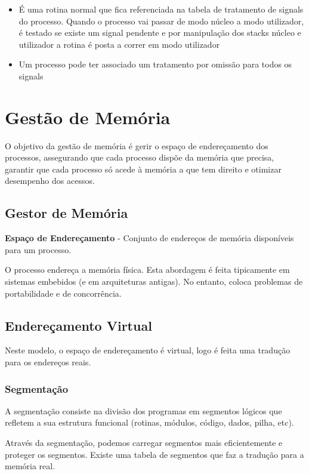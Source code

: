 \documentclass[11pt]{article}
\begin{document}
\begin{itemize}
    \item É uma rotina normal que fica referenciada na tabela de tratamento de signals do processo. Quando o processo vai passar de modo núcleo a modo utilizador, é testado se existe um signal pendente e por manipulação dos stacks núcleo e utilizador a rotina é posta a correr em modo utilizador
    \item Um processo pode ter associado um tratamento por omissão para todos os signals
\end{itemize}

\newpage

\section{Gestão de Memória}

O objetivo da gestão de memória é gerir o espaço de endereçamento dos processos, assegurando que cada processo dispõe da memória que precisa, garantir que cada processo só acede à memória a que tem direito e otimizar desempenho dos acessos.

\subsection{Gestor de Memória}

\textbf{Espaço de Endereçamento} - Conjunto de endereços de memória disponíveis para um processo.

O processo endereça a memória física. Esta abordagem é feita tipicamente em sistemas embebidos (e em arquiteturas antigas). No entanto, coloca problemas de portabilidade e de concorrência.

\subsection{Endereçamento Virtual}

Neste modelo, o espaço de endereçamento é virtual, logo é feita uma tradução para os endereços reais.

\subsubsection{Segmentação}

A segmentação consiste na divisão dos programas em segmentos lógicos que refletem a sua estrutura funcional (rotinas, módulos, código, dados, pilha, etc).

Através da segmentação, podemos carregar segmentos mais eficientemente e proteger os segmentos. Existe uma tabela de segmentos que faz a tradução para a memória real.
\end{document}

